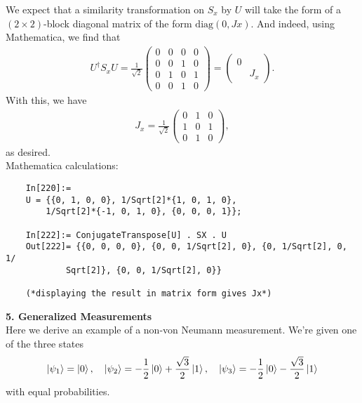 \documentclass{article}
\theoremstyle{definition}
\newcommand{\f}[2]{\frac{#1}{#2}}
\begin{document}
We expect that a similarity transformation on $S_x$ by $U$ will take the form of a $(2\times 2)$-block diagonal matrix of the form $\text{diag}(0,Jx)$. And indeed, using Mathematica, we find that
\begin{align*}
	U^\dagger S_x U = \f{1}{\sqrt{2}}\begin{pmatrix}
		0&0&0&0\\
		0&0&1&0\\
		0&1&0&1\\
		0&0&1&0
	\end{pmatrix} = \begin{pmatrix}
	0 & \\
	& J_x
\end{pmatrix}.
\end{align*}
With this, we have
\begin{align*}
		J_x = \f{1}{\sqrt{2}}\begin{pmatrix}
		0 &1 &0 \\ 
		1 &0 &1 \\
		0 &1 &0 
	\end{pmatrix}, 
\end{align*}
as desired. \\


Mathematica calculations:
\begin{lstlisting}
	In[220]:= 
	U = {{0, 1, 0, 0}, 1/Sqrt[2]*{1, 0, 1, 0}, 
		1/Sqrt[2]*{-1, 0, 1, 0}, {0, 0, 0, 1}};
	
	In[222]:= ConjugateTranspose[U] . SX . U
	Out[222]= {{0, 0, 0, 0}, {0, 0, 1/Sqrt[2], 0}, {0, 1/Sqrt[2], 0, 1/
			Sqrt[2]}, {0, 0, 1/Sqrt[2], 0}}
		
	(*displaying the result in matrix form gives Jx*)
\end{lstlisting}


\noindent \textbf{5. Generalized Measurements}\\


Here we derive an example of a non-von Neumann measurement. We're given one of the three states
\begin{align*}
	\ket{\psi_1} = \ket{0} , \quad \ket{\psi_2} = -\f{1}{2} \ket{0} + \f{\sqrt{3}}{2}\ket{1}, \quad \ket{\psi_3} = -\f{1}{2}\ket{0} - \f{\sqrt{3}}{2}\ket{1}
\end{align*}
with equal probabilities. 
\end{document}
